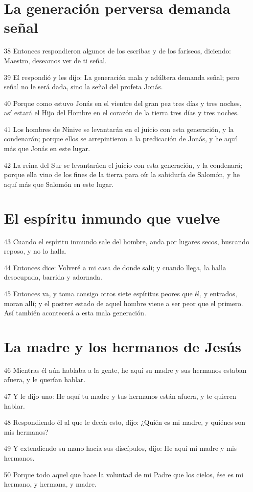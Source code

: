 \section*{La generación perversa demanda señal}

\par 38 Entonces respondieron algunos de los escribas y de los fariseos, diciendo: Maestro, deseamos ver de ti señal.
\par 39 El respondió y les dijo: La generación mala y adúltera demanda señal; pero señal no le será dada, sino la señal del profeta Jonás.
\par 40 Porque como estuvo Jonás en el vientre del gran pez tres días y tres noches, así estará el Hijo del Hombre en el corazón de la tierra tres días y tres noches.
\par 41 Los hombres de Nínive se levantarán en el juicio con esta generación, y la condenarán; porque ellos se arrepintieron a la predicación de Jonás, y he aquí más que Jonás en este lugar.
\par 42 La reina del Sur se levantaráen el juicio con esta generación, y la condenará; porque ella vino de los fines de la tierra para oír la sabiduría de Salomón, y he aquí más que Salomón en este lugar.

\section*{El espíritu inmundo que vuelve}

\par 43 Cuando el espíritu inmundo sale del hombre, anda por lugares secos, buscando reposo, y no lo halla.
\par 44 Entonces dice: Volveré a mi casa de donde salí; y cuando llega, la halla desocupada, barrida y adornada.
\par 45 Entonces va, y toma consigo otros siete espíritus peores que él, y entrados, moran allí; y el postrer estado de aquel hombre viene a ser peor que el primero. Así también acontecerá a esta mala generación.

\section*{La madre y los hermanos de Jesús}

\par 46 Mientras él aún hablaba a la gente, he aquí su madre y sus hermanos estaban afuera, y le querían hablar.
\par 47 Y le dijo uno: He aquí tu madre y tus hermanos están afuera, y te quieren hablar.
\par 48 Respondiendo él al que le decía esto, dijo: ¿Quién es mi madre, y quiénes son mis hermanos?
\par 49 Y extendiendo su mano hacia sus discípulos, dijo: He aquí mi madre y mis hermanos.
\par 50 Porque todo aquel que hace la voluntad de mi Padre que los cielos, ése es mi hermano, y hermana, y madre.

